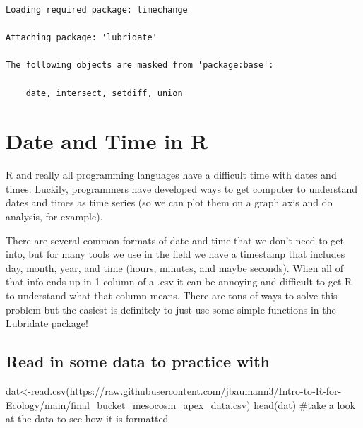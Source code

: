 \documentclass[
  letterpaper,
  DIV=11,
  numbers=noendperiod]{scrartcl}
\newenvironment{Shaded}{\begin{snugshade}}{\end{snugshade}}
\newcommand{\CommentTok}[1]{\textcolor[rgb]{0.37,0.37,0.37}{#1}}
\newcommand{\FunctionTok}[1]{\textcolor[rgb]{0.28,0.35,0.67}{#1}}
\newcommand{\NormalTok}[1]{\textcolor[rgb]{0.00,0.23,0.31}{#1}}
\newcommand{\OtherTok}[1]{\textcolor[rgb]{0.00,0.23,0.31}{#1}}
\newcommand{\StringTok}[1]{\textcolor[rgb]{0.13,0.47,0.30}{#1}}
\begin{document}
\begin{verbatim}
Loading required package: timechange

Attaching package: 'lubridate'

The following objects are masked from 'package:base':

    date, intersect, setdiff, union
\end{verbatim}

\hypertarget{date-and-time-in-r}{%
\section{\texorpdfstring{\textbf{Date and Time in
R}}{Date and Time in R}}\label{date-and-time-in-r}}

R and really all programming languages have a difficult time with dates
and times. Luckily, programmers have developed ways to get computer to
understand dates and times as time series (so we can plot them on a
graph axis and do analysis, for example).

There are several common formats of date and time that we don't need to
get into, but for many tools we use in the field we have a timestamp
that includes day, month, year, and time (hours, minutes, and maybe
seconds). When all of that info ends up in 1 column of a .csv it can be
annoying and difficult to get R to understand what that column means.
There are tons of ways to solve this problem but the easiest is
definitely to just use some simple functions in the Lubridate package!

\hypertarget{read-in-some-data-to-practice-with}{%
\subsection{\texorpdfstring{\textbf{Read in some data to practice
with}}{Read in some data to practice with}}\label{read-in-some-data-to-practice-with}}

\begin{Shaded}
\begin{Highlighting}[]
\NormalTok{dat}\OtherTok{\textless{}{-}}\FunctionTok{read.csv}\NormalTok{(}\StringTok{\textquotesingle{}https://raw.githubusercontent.com/jbaumann3/Intro{-}to{-}R{-}for{-}Ecology/main/final\_bucket\_mesocosm\_apex\_data.csv\textquotesingle{}}\NormalTok{)}
\FunctionTok{head}\NormalTok{(dat) }\CommentTok{\#take a look at the data to see how it is formatted}
\end{Highlighting}
\end{Shaded}
\end{document}
